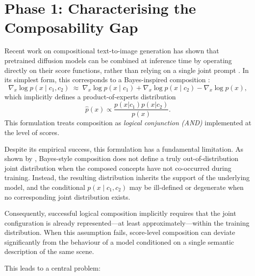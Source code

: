 
\section{Phase 1: Characterising the Composability Gap}

Recent work on compositional text-to-image generation has shown that pretrained diffusion models can be combined at inference time by operating directly on their score functions, rather than relying on a single joint prompt \citep{NEURIPS2020_49856ed4,du2024compositional,liu2022compositional}. In its simplest form, this corresponds to a Bayes-inspired composition \citep{mechanisms2025projective}:
\begin{equation}
\nabla_x \log p(x \mid c_1, c_2)
\;\approx\;
\nabla_x \log p(x \mid c_1)
+
\nabla_x \log p(x \mid c_2)
-
\nabla_x \log p(x),
\end{equation}
which implicitly defines a product-of-experts distribution
\begin{equation}
\hat p(x) \propto \frac{p(x|c_1)p(x|c_2)}{p(x)}.
\end{equation}
This formulation treats composition as \textit{logical conjunction (AND)} implemented at the level of scores.

Despite its empirical success, this formulation has a fundamental limitation. 
As shown by \citet{mechanisms2025projective}, Bayes-style composition does not define a truly out-of-distribution joint distribution when the composed concepts have not co-occurred during training. Instead, the resulting distribution inherits the support of the underlying model, and the conditional $p(x \mid c_1, c_2)$ may be ill-defined or degenerate when no corresponding joint distribution exists.

Consequently, successful logical composition implicitly requires that the joint configuration is already represented—at least approximately—within the training distribution. When this assumption fails, score-level composition can deviate significantly from the behaviour of a model conditioned on a single semantic description of the same scene.

This leads to a central problem:
\begin{center}
{\setlength{\fboxsep}{6pt}%
}
\end{center}

